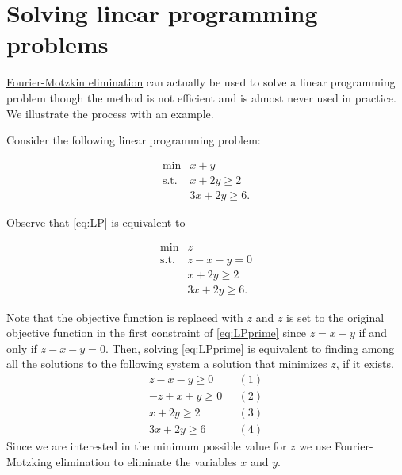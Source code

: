 %

\chapter{Solving linear programming problems}\label{fund-lp}

\protect\hyperlink{fm}{Fourier-Motzkin elimination} can actually be used
to solve a linear programming problem though the method is not efficient
and is almost never used in practice. We illustrate the process with an
example.

Consider the following linear programming problem:

\begin{equation}
\begin{array}{rl}
\min & x + y \\
\text{s.t.}
& x + 2y  \geq 2 \\
& 3x + 2y  \geq 6.
\end{array}\label{eq:LP}
\end{equation}

Observe that \eqref{eq:LP} is equivalent to

\begin{equation}
\begin{array}{rl}
\min & z \\
\text{s.t.}
& z - x - y = 0 \\
& x + 2y  \geq 2 \\
& 3x + 2y  \geq 6.
\end{array}\label{eq:LPprime}
\end{equation}

Note that the objective function is replaced with \(z\) and \(z\) is set
to the original objective function in the first constraint of
\eqref{eq:LPprime} since \(z = x+ y\) if and only if \(z-x-y=0\). Then,
solving \eqref{eq:LPprime} is equivalent to finding among all the
solutions to the following system a solution that minimizes \(z\), if it
exists. \[
\begin{array}{rl}
 z - x - y \geq 0 & ~~~(1) \\
-z + x + y \geq 0 & ~~~(2) \\
 x + 2y  \geq 2 &~~~(3)\\
 3x + 2y  \geq 6 & ~~~(4)
\end{array}
\] Since we are interested in the minimum possible value for \(z\) we
use Fourier-Motzking elimination to eliminate the variables \(x\) and
\(y\).

